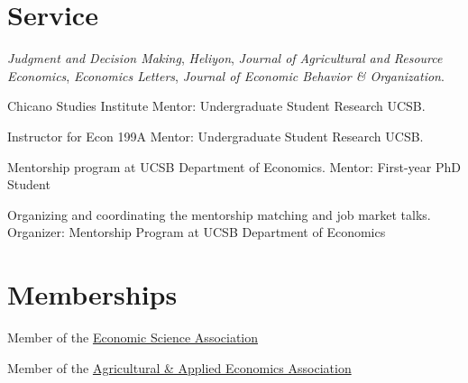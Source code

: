 
\section{Service}

{\textit{Judgment and Decision Making}, \textit{Heliyon}, \textit{Journal of Agricultural and Resource Economics},  \textit{Economics Letters}, \textit{Journal of Economic Behavior \& Organization}.}

{Chicano Studies Institute}
{Mentor: Undergraduate Student Research}
{}
{UCSB.}
{}


{Instructor for Econ 199A}
{Mentor: Undergraduate Student Research}
{}
{UCSB.}
{}

{Mentorship program at UCSB Department of Economics.}
{Mentor: First-year PhD Student}
{}
{}{}

{Organizing and coordinating the mentorship matching and job market talks.}
{Organizer: Mentorship Program at UCSB Department of Economics}{}
{}{}

\section{Memberships}

{}
{Member of the \href{https://www.economicscience.org/}{Economic Science Association}}
{}
{}{}

{}
{Member of the \href{https://www.aaea.org/}{Agricultural \& Applied Economics Association}}
{}
{}{}



